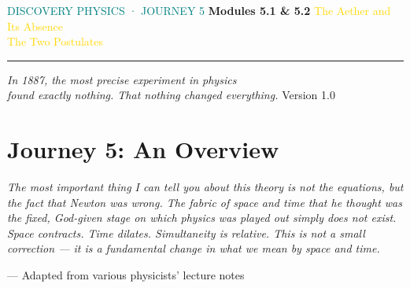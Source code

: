 \documentclass[12pt, a4paper, twoside]{book}
\begin{document}
\begin{titlepage}
\pagecolor{deep}\color{white}\centering\vspace*{1.8cm}


\vspace{0.4cm}
{\fontsize{11}{14}\selectfont\textcolor{teal}{\MakeUppercase{Discovery Physics · Journey 5}}}
\vspace{0.3cm}
{\fontsize{34}{40}\selectfont\bfseries Modules 5.1 \& 5.2}
\vspace{0.3cm}
{\fontsize{20}{26}\selectfont\textcolor{gold}{%
The Aether and Its Absence\\[5pt]
The Two Postulates}}
\vspace{0.5cm}
\textcolor{white!60}{\rule{8cm}{0.4pt}}
\vspace{0.4cm}
{\fontsize{12}{18}\selectfont\textcolor{white!80}{\itshape
In 1887, the most precise experiment in physics\\[4pt]
found exactly nothing. That nothing changed everything.}}
\vfill\textcolor{white!30}{\small Version 1.0}
\end{titlepage}
\nopagecolor

\chapter*{Journey 5: An Overview}

\epigraph{\itshape
  The most important thing I can tell you about this theory is not the
  equations, but the fact that Newton was wrong. The fabric of space and time
  that he thought was the fixed, God-given stage on which physics was played
  out simply does not exist. Space contracts. Time dilates. Simultaneity is
  relative. This is not a small correction --- it is a fundamental change
  in what we mean by space and time.
}{--- Adapted from various physicists' lecture notes}
\end{document}
